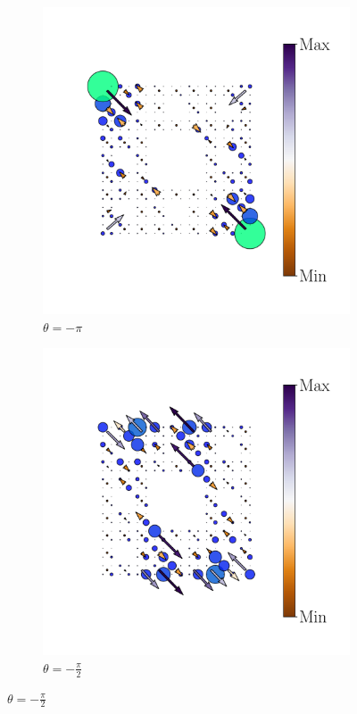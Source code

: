 \begin{figure}[tbh!]
     \centering
    \captionsetup[sub]{font=small}
     \begin{minipage}[h!]{1.0\textwidth}
         \begin{subfigure}[b!]{0.2 \textwidth}
             \caption{$\theta = -\pi$}
             \includegraphics[width=\textwidth]{Imagenes/Resultados_pump_Fractal/x/hoti_pomp_x_pos1.pdf}
         \end{subfigure}\hspace*{-0.5em}
          \begin{subfigure}[b!]{0.2 \textwidth}
             \caption*{$\theta = -\frac{\pi}{2}$}
             \includegraphics[width=\textwidth]{Imagenes/Resultados_pump_Fractal/x/hoti_pomp_x_pos2.pdf}         

\end{subfigure}
\end{minipage}
\end{figure}
